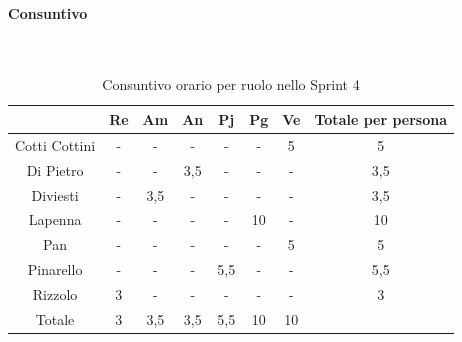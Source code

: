 \documentclass{article}
\begin{document}
                \paragraph{Consuntivo}\mbox{}\\
                \begin{table}[H]
                    \centering
                    \begin{tabular}{|c|c|c|c|c|c|c|c|}
                    \hline
                                & Re  & Am  & An  & Pj  & Pg  & Ve  & Totale per persona \\ \hline
                    Cotti Cottini & -   & -   & -   & -   & -   & 5   & 5                  \\ \hline
                    Di Pietro     & -   & -   & 3,5 & -   & -   & -   & 3,5                \\ \hline
                    Diviesti      & -   & 3,5 & -   & -   & -   & -   & 3,5                \\ \hline
                    Lapenna       & -   & -   & -   & -   & 10  & -   & 10                 \\ \hline
                    Pan           & -   & -   & -   & -   & -   & 5   & 5                  \\ \hline
                    Pinarello     & -   & -   & -   & 5,5 & -   & -   & 5,5                \\ \hline
                    Rizzolo       & 3   & -   & -   & -   & -   & -   & 3                  \\ \hline
                    Totale        & 3   & 3,5 & 3,5 & 5,5 & 10  & 10  &                    \\ \hline
                    \end{tabular}
                    \caption{Consuntivo orario per ruolo nello Sprint 4}
                \end{table}

\end{document}
